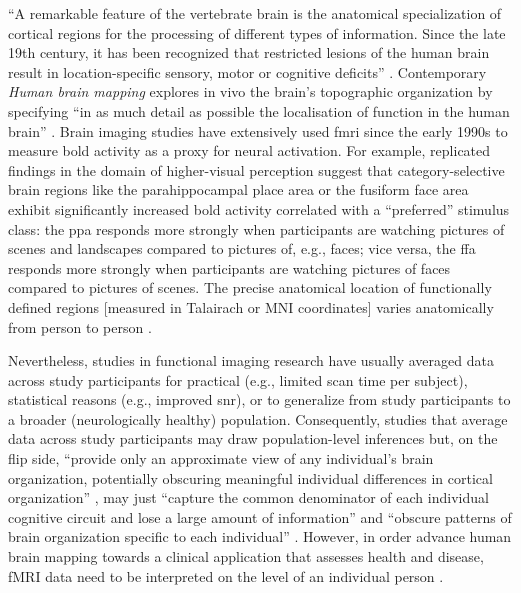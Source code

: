 

``A remarkable feature of the vertebrate brain is the anatomical specialization
of cortical regions for the processing of different types of information. Since
the late 19th century, it has been recognized that restricted lesions of the
human brain result in location-specific sensory, motor or cognitive deficits''
\citep{cohen1994localization}.
Contemporary \textit{Human brain mapping} \citep[e.g.,][]{raichle2009brief}
explores in vivo the brain's topographic organization
\citep[e.g.,][]{eickhoff2018topographic} by specifying ``in as much detail as
possible the localisation of function in the human brain''
\citep{savoy2001history}.
Brain imaging studies have extensively used \ac{fmri} since the early 1990s to
measure \ac{bold} activity as a proxy for neural activation.
For example, replicated findings in the domain of higher-visual perception
suggest that category-selective brain regions like the parahippocampal place
area \citep{epstein1998ppa, epstein1999parahippocampal} or the fusiform face
area \citep{kanwisher1997ffa, kanwisher2006fusiform} exhibit significantly
increased \ac{bold} activity correlated with a ``preferred'' stimulus class:
%
the \ac{ppa} responds more strongly when participants are watching pictures of
scenes and landscapes compared to pictures of, e.g., faces;
%
vice versa, the \ac{ffa} responds more strongly when participants are watching
pictures of faces compared to pictures of scenes.
%
The precise anatomical location of functionally defined regions [measured in
Talairach or MNI coordinates] varies anatomically from person to person
\citep{friston2006critique, saxe2006divide}.

%
Nevertheless, studies in functional imaging research have usually averaged data
across study participants for
%
practical (e.g., limited scan time per subject),
%
statistical reasons (e.g., improved \ac{snr}),
%
or to generalize from study participants to a broader (neurologically healthy)
population.
%
Consequently, studies that average data across study participants may draw
population-level inferences but, on the flip side,  ``provide only an
approximate view of any individual's brain organization, potentially obscuring
meaningful individual differences in cortical organization''
\citep{laumann2015functional}, may just ``capture the common denominator of each
individual cognitive circuit and lose a large amount of information''
\citep{pinel2007fast} and ``obscure patterns of brain organization specific to
each individual'' \citep{laumann2015functional}.
%
%
However, in order advance human brain mapping towards a clinical application that
assesses health and disease, fMRI data need to be interpreted on the level of an
individual person \citep{dubois2016building, wegrzyn2018thought}.


